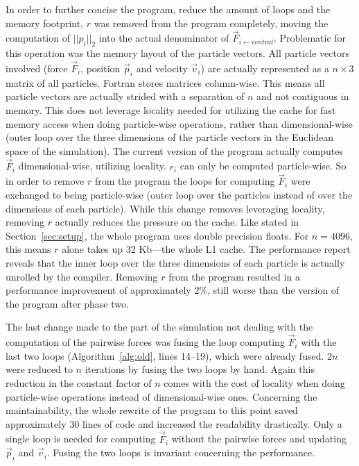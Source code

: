 \documentclass[twoside,11pt]{article}
\begin{document}
In order to further concise the program, reduce the amount of loops
and the memory footprint, $r$ was removed from the program completely,
moving the computation of $||p_i||_2$ into the actual denominator of
$\vec{F}_{i \leftarrow central}$.
Problematic for this operation was the memory layout of the particle
vectors.
All particle vectors involved (force $\vec{F}_i$, position $\vec{p}_i$
and velocity $\vec{v}_i$) are actually represented as a $n \times 3$
matrix of all particles.
Fortran stores matrices column-wise.
This means all particle vectors are actually strided with a separation
of $n$ and not contiguous in memory.
This does not leverage locality needed for utilizing the cache for
fast memory access when doing particle-wise operations, rather than
dimensional-wise (outer loop over the three dimensions of the particle
vectors in the Euclidean space of the simulation).
The current version of the program actually computes $\vec{F}_i$
dimensional-wise, utilizing locality.
$r_i$ can only be computed particle-wise.
So in order to remove $r$ from the program the loops for computing
$\vec{F}_i$ were exchanged to being particle-wise (outer loop over the
particles instead of over the dimensions of each particle).
While this change removes leveraging locality, removing $r$ actually
reduces the pressure on the cache.
Like stated in Section~\ref{sec:setup}, the whole program uses
double precision floats.
For $n = 4096$, this means $r$ alone takes up 32 Kb---the whole L1
cache.
The performance report reveals that the inner loop over the three
dimensions of each particle is actually unrolled by the compiler.
Removing $r$ from the program resulted in a performance improvement of
approximately 2\%, still worse than the version of the program after
phase two.

The last change made to the part of the simulation not dealing with
the computation of the pairwise forces was fusing the loop computing
$\vec{F}_i$ with the last two loops (Algorithm~\ref{alg:old}, lines
14--19), which were already fused.
$2n$ were reduced to $n$ iterations by fusing the two loops by hand.
Again this reduction in the constant factor of $n$ comes with the
cost of locality when doing particle-wise operations instead of
dimensional-wise ones.
Concerning the maintainability, the whole rewrite of the program to
this point saved approximately 30 lines of code and increased the
readability drastically.
Only a single loop is needed for computing $\vec{F}_i$ without the
pairwise forces and updating $\vec{p}_i$ and $\vec{v}_i$.
Fusing the two loops is invariant concerning the performance.
\end{document}
